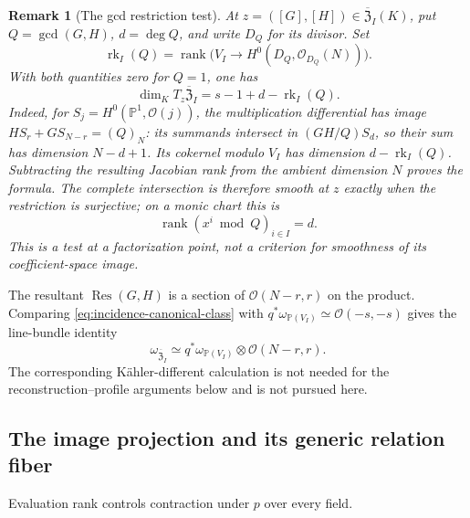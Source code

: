 \documentclass[10pt,fleqn]{article}
\numberwithin{equation}{section}
\newtheorem{remark}[theorem]{Remark}
\newcommand{\PP}{\mathbb P}
\newcommand{\rank}{\operatorname{rank}}
\newcommand{\Res}{\operatorname{Res}}
\begin{document}
\begin{remark}[The gcd restriction test]\label{prop:factorization-secant-smoothness}
At $z=([G],[H])\in\overline{\mathfrak Z}_I(K)$, put $Q=\gcd(G,H)$,
$d=\deg Q$, and write $D_Q$ for its divisor.  Set
\begin{equation}\label{eq:factorization-secant-restriction}
 \operatorname{rk}_I(Q)=\rank\bigl(V_I\longrightarrow
 H^0(D_Q,\mathcal O_{D_Q}(N))\bigr).
\end{equation}
With both quantities zero for $Q=1$, one has
\begin{equation}\label{eq:factorization-incidence-tangent-dimension}
 \dim_KT_z\overline{\mathfrak Z}_I=s-1+d-\operatorname{rk}_I(Q).
\end{equation}
Indeed, for $S_j=H^0(\PP^1,\mathcal O(j))$, the multiplication differential
has image $HS_r+GS_{N-r}=(Q)_N$: its summands intersect in
$(GH/Q)S_d$, so their sum has dimension $N-d+1$.
Its cokernel modulo $V_I$ has dimension $d-\operatorname{rk}_I(Q)$.
Subtracting the resulting Jacobian rank from the ambient dimension $N$
proves the formula.  The complete intersection is therefore smooth at $z$
exactly when the restriction is surjective; on a monic chart this is
\begin{equation}\label{eq:factorization-secant-rank}
 \rank(x^i\bmod Q)_{i\in I}=d.
\end{equation}
This is a test at a factorization point, not a criterion for smoothness of
its coefficient-space image.
\end{remark}

The resultant $\Res(G,H)$ is a section of
$\mathcal O(N-r,r)$ on the product.  Comparing \eqref{eq:incidence-canonical-class} with
$q^*\omega_{\PP(V_I)}\simeq\mathcal O(-s,-s)$ gives the line-bundle identity
\begin{equation}\label{eq:projective-RH-line-bundle}
 \omega_{\overline{\mathfrak Z}_I}
 \simeq q^*\omega_{\PP(V_I)}\otimes\mathcal O(N-r,r).
\end{equation}
The corresponding K\"ahler-different calculation is not needed for the reconstruction--profile arguments below and is not pursued here.


\subsection{The image projection and its generic relation fiber}
\label{r19:sec:image-projection}
Evaluation rank controls contraction under $p$ over every field.
\end{document}
